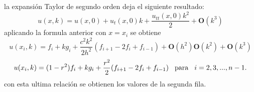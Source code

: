 \documentclass{beamer}
\begin{document}

\begin{frame}

la expansión Taylor de segundo orden deja el siguiente resultado:
\begin{equation*}
    u(x,k)=u(x,0)+u_t(x,0)k+\frac{u_{tt}(x,0)k^2}{2}+\textbf{O}(k^3)
\end{equation*}
aplicando la formula anterior con $x=x_i$ se obtiene
\begin{equation*}
    u(x_i,k)=f_i+kg_i+\frac{c^2k^2}{2h^2}(f_{i+1}-2f_i+f_{i-1})+\textbf{O}(h^2) \textbf{O}(k^2)+\textbf{O}(k^3)
\end{equation*}
\begin{equation*}
    u(x_i,k)=(1-r^2)f_i+kg_i+\frac{r^2}{2}(f_{i+1}-2f_i+f_{i-1}) \hspace{0.3cm}\text{para}\hspace{0.3cm}i=2,3,...,n-1.
\end{equation*}
con esta ultima relación se obtienen los valores de la segunda fila.


\end{frame}

\end{document}
